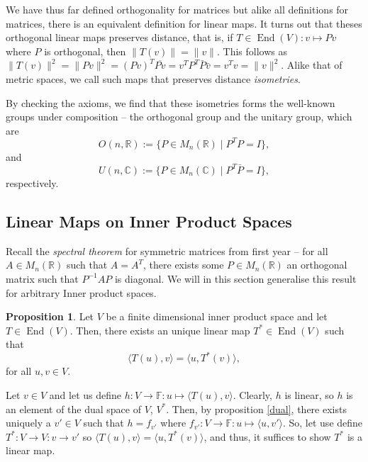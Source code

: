 \documentclass[
]{article}
\theoremstyle{definition}
\newtheorem{prop}{Proposition}[section]
\theoremstyle{definition}
\begin{document}
We have thus far defined orthogonality for matrices but alike all
definitions for matrices, there is an equivalent definition for linear
maps. It turns out that theses orthogonal linear maps preserves
distance, that is, if \(T \in \mathop{\mathrm{End}}(V) : v \mapsto Pv\)
where \(P\) is orthogonal, then \(\| T(v) \| = \| v \|\). This follows
as
\(\|T(v)\|^2 = \|Pv\|^2 = (Pv)^T \overline{Pv} = v^T P^T \bar{P} \bar{v} = v^T v = \| v \|^2\).
Alike that of metric spaces, we call such maps that preserves distance
\emph{isometries}.

By checking the axioms, we find that these isometries forms the
well-known groups under composition -- the orthogonal group and the
unitary group, which are
\[O(n, \mathbb{R}) := \{P \in M_n(\mathbb{R}) \mid P^T P = I\},\] and
\[U(n, \mathbb{C}) := \{P \in M_n(\mathbb{C}) \mid P^T \bar{P} = I\},\]
respectively.

\hypertarget{linear-maps-on-inner-product-spaces}{%
\subsection{Linear Maps on Inner Product
Spaces}\label{linear-maps-on-inner-product-spaces}}

Recall the \emph{spectral theorem} for symmetric matrices from first
year -- for all \(A \in M_n(\mathbb{R})\) such that \(A = A^T\), there
exists some \(P \in M_n(\mathbb{R})\) an orthogonal matrix such that
\(P^{-1} A P\) is diagonal. We will in this section generalise this
result for arbitrary Inner product spaces.

\begin{prop}
  Let \(V\) be a finite dimensional inner product space and let \(T \in \mathop{\mathrm{End}}(V)\). 
  Then, there exists an unique linear map \(T^* \in \mathop{\mathrm{End}}(V)\) such that 
  \[\langle T(u), v \rangle = \langle u, T^*(v) \rangle,\]
  for all \(u, v \in V\).
\end{prop}
\proof

Let \(v \in V\) and let us define
\(h : V \to \mathbb{F} : u \mapsto \langle T(u), v \rangle\). Clearly,
\(h\) is linear, so \(h\) is an element of the dual space of \(V\),
\(V^*\). Then, by proposition \ref{dual}, there exists uniquely a
\(v' \in V\) such that \(h = f_{v'}\) where
\(f_{v'} : V \to \mathbb{F} : u \mapsto \langle u, v' \rangle\). So, let
use define \(T^* : V \to V : v \to v'\) so
\(\langle T(u), v \rangle = \langle u, T^*(v) \rangle\), and thus, it
suffices to show \(T^*\) is a linear map.
\end{document}
